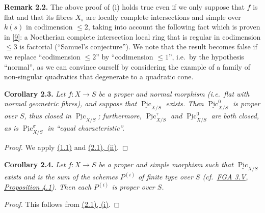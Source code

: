 \documentclass{article}
\newenvironment{itenv}[1]
  {\phantomsection\par\smallskip\noindent\textbf{#1.}\itshape}
  {\par\smallskip}
\newenvironment{rmenv}[1]
  {\phantomsection\par\smallskip\noindent\textbf{#1.}\rmfamily}
  {\par\smallskip}
\theoremstyle{definition}
\theoremstyle{definition}
\theoremstyle{definition}
\theoremstyle{definition}
\theoremstyle{remark}
\begin{document}
\leavevmode{}%
\begin{rmenv}{Remark 2.2}
The above proof of (i) holds true even if we only suppose that \(f\) is flat and that its fibres \(X_s\) are locally complete intersections and simple over \(k(s)\) in codimension \(\leqslant 2\), taking into account the following fact which is proven in {[}\protect\hyperlink{ref-Gro1960b}{9}{]}: a Noetherian complete intersection local ring that is regular in codimension \(\leqslant 3\) is factorial (``Samuel's conjecture'').
We note that the result becomes false if we replace ``codimension \(\leqslant 2\)'' by ``codimension \(\leqslant 1\)'', i.e.~by the hypothesis ``normal'', as we can convince ourself by considering the example of a family of non-singular quadratics that degenerate to a quadratic cone.

\end{rmenv}

\leavevmode{}%
\begin{itenv}{Corollary 2.3}
Let \(f\colon X\to S\) be a proper and normal morphism (i.e.~flat with normal geometric fibres), and suppose that \(\underline{\operatorname{Pic}}_{X/S}\) exists.
Then \(\underline{\operatorname{Pic}}_{X/S}^0\) is proper over \(S\), thus closed in \(\underline{\operatorname{Pic}}_{X/S}\);
furthermore, \(\underline{\operatorname{Pic}}_{X/S}^\tau\) and \(\underline{\operatorname{Pic}}_{X/S}^0\) are both closed, as is \(\underline{\operatorname{Pic}}_{X/S}^\sigma\) in ``equal characteristic''.

\end{itenv}

\begin{proof}
We apply \protect\hyperlink{fga-3-vi-theorem-1.1}{(1.1)} and \protect\hyperlink{fga-3-vi-theorem-2.1}{(2.1), (ii)}.
\end{proof}

\leavevmode{}%
\begin{itenv}{Corollary 2.4}
Let \(f\colon X\to S\) be a proper and simple morphism such that \(\underline{\operatorname{Pic}}_{X/S}\) exists and is the sum of the schemes \(P^{(i)}\) of finite type over \(S\) (cf.~\protect\hyperlink{fga-3-v-proposition-4.1}{FGA 3.V, Proposition 4.1}).
Then each \(P^{(i)}\) is proper over \(S\).

\end{itenv}

\begin{proof}
This follows from \protect\hyperlink{fga-3-vi-theorem-2.1}{(2.1), (i)}.
\end{proof}
\end{document}
